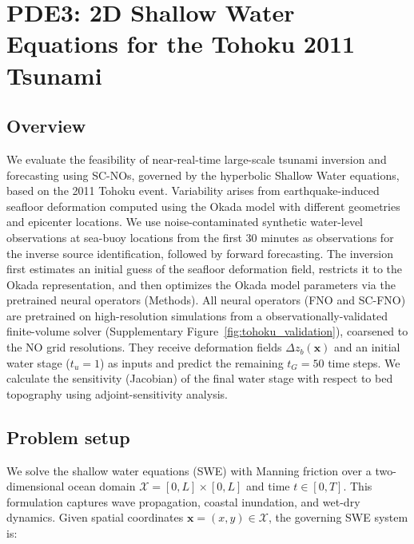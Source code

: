 \section{PDE3: 2D Shallow Water Equations for the Tohoku 2011 Tsunami}
\label{sec:SWE-Tohoku}

\renewcommand{\thefigure}{E.\arabic{figure}}  %
\renewcommand{\thetable}{E.\arabic{table}}  %


\subsection*{Overview}
We evaluate the feasibility of near-real-time large-scale tsunami inversion and forecasting using SC-NOs, governed by the hyperbolic Shallow Water equations, based on the 2011 Tohoku event. Variability arises from earthquake-induced seafloor deformation computed using the Okada model \citep{grilli2013numerical} with different geometries and epicenter locations. We use noise-contaminated synthetic water-level observations at sea-buoy locations from the first 30 minutes as observations for the inverse source identification, followed by forward forecasting. The inversion first estimates an initial guess of the seafloor deformation field, restricts it to the Okada representation, and then optimizes the Okada model parameters via the pretrained neural operators (Methods). All neural operators (FNO and SC-FNO) are pretrained on high-resolution simulations from a observationally-validated finite-volume solver (Supplementary Figure~\ref{fig:tohoku_validation}), coarsened to the NO grid resolutions. They receive deformation fields $\Delta z_b(\mathbf{x})$ and an initial water stage ($t_u = 1$) as inputs and predict the remaining $t_G = 50$ time steps. We calculate the sensitivity (Jacobian) of the final water stage with respect to bed topography using adjoint-sensitivity analysis.


\subsection*{Problem setup}
We solve the shallow water equations (SWE) with Manning friction over a two-dimensional ocean domain \( \mathcal{X} = [0, L] \times [0, L] \) and time \( t \in [0, T] \). This formulation captures wave propagation, coastal inundation, and wet-dry dynamics. Given spatial coordinates \(\textbf{x} = (x, y) \in \mathcal{X} \), the governing SWE system is:



